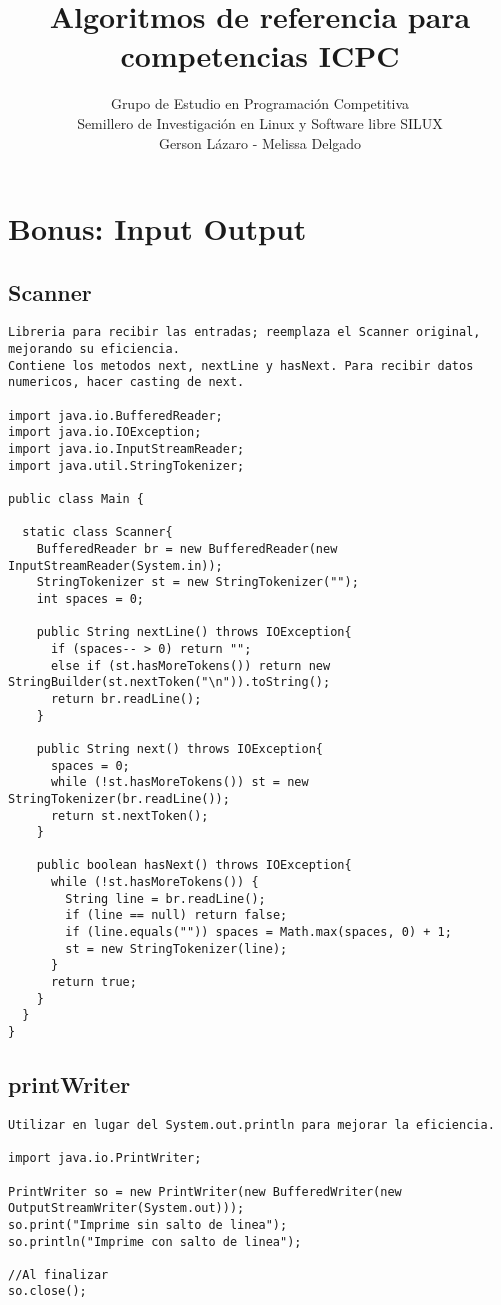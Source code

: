 \documentclass[10pt,letterpaper,twocolumn,twosided]{article}
\begin{document}
\title{Algoritmos de referencia para competencias ICPC}
\author{Grupo de Estudio en Programación Competitiva \\ Semillero de Investigación en Linux y Software libre SILUX \\ Gerson Lázaro - Melissa Delgado}
\maketitle
\tableofcontents
{}


\section{Bonus: Input Output}

\subsection{Scanner}
\begin{lstlisting}
Libreria para recibir las entradas; reemplaza el Scanner original, mejorando su eficiencia. 
Contiene los metodos next, nextLine y hasNext. Para recibir datos numericos, hacer casting de next.

import java.io.BufferedReader;
import java.io.IOException;
import java.io.InputStreamReader;
import java.util.StringTokenizer;

public class Main {
    
  static class Scanner{
    BufferedReader br = new BufferedReader(new InputStreamReader(System.in));
    StringTokenizer st = new StringTokenizer("");
    int spaces = 0;

    public String nextLine() throws IOException{
      if (spaces-- > 0) return "";
      else if (st.hasMoreTokens()) return new StringBuilder(st.nextToken("\n")).toString();
      return br.readLine();
    }

    public String next() throws IOException{
      spaces = 0;
      while (!st.hasMoreTokens()) st = new StringTokenizer(br.readLine());
      return st.nextToken();
    }

    public boolean hasNext() throws IOException{
      while (!st.hasMoreTokens()) {
        String line = br.readLine();
        if (line == null) return false;
        if (line.equals("")) spaces = Math.max(spaces, 0) + 1;
        st = new StringTokenizer(line);
      }
      return true;
    }
  }
}\end{lstlisting}

\subsection{printWriter}
\begin{lstlisting}
Utilizar en lugar del System.out.println para mejorar la eficiencia.

import java.io.PrintWriter;

PrintWriter so = new PrintWriter(new BufferedWriter(new OutputStreamWriter(System.out)));
so.print("Imprime sin salto de linea");
so.println("Imprime con salto de linea");

//Al finalizar
so.close();
\end{lstlisting}
\end{document}
